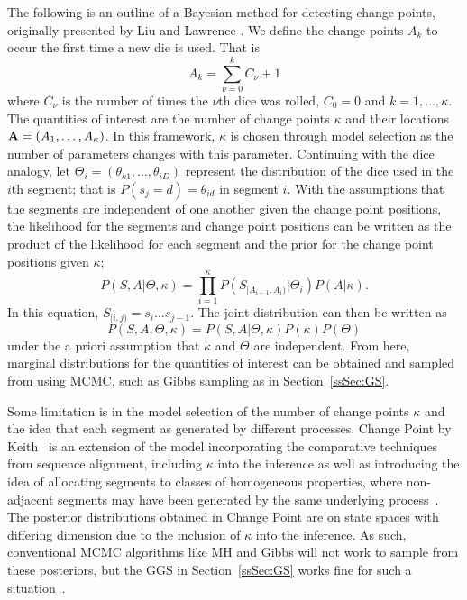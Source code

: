 The following is an outline of a Bayesian method for detecting change points, originally presented by Liu and Lawrence \cite{liu1999bayesian}. We define the change points $A_k$ to occur the first time a new die is used. That is
    \begin{equation}
        A_k = \sum_{\nu=0}^{k}C_\nu + 1
    \end{equation}
where $C_\nu$ is the number of times the $\nu$th dice was rolled, $C_0 = 0$ and $k = 1,\ldots,\kappa$. The quantities of interest are the number of change points $\kappa$ and their locations $\mathbf{A} = (A_1,\ldots,A_\kappa)$. In this framework, $\kappa$ is chosen through model selection as the number of parameters changes with this parameter. Continuing with the dice analogy, let $\Theta_i = (\theta_{k1},\ldots,\theta_{iD})$ represent the distribution of the dice used in the $i$th segment; that is $P(s_j = d) = \theta_{id}$ in segment $i$. With the assumptions that the segments are independent of one another given the change point positions, the likelihood for the segments and change point positions can be written as the product of the likelihood for each segment and the prior for the change point positions given $\kappa$;
    \begin{equation}
        P(S,A|\Theta, \kappa) = \prod_{i=1}^{\kappa} P(S_{[A_{i-1},A_{i})}|\Theta_i)P(A|\kappa).
    \end{equation}
In this equation, $S_{[i,j)} = s_i\ldots s_{j-1}$. The joint distribution can then be written as
    \begin{equation}
        P(S,A,\Theta,\kappa) =  P(S,A|\Theta, \kappa)P(\kappa)P(\Theta)
    \end{equation}
under the a priori assumption that $\kappa$ and $\Theta$ are independent. From here, marginal distributions for the quantities of interest can be obtained and sampled from using MCMC, such as Gibbs sampling as in Section~\ref{ssSec:GS}. 

Some limitation is in the model selection of the number of change points $\kappa$ and the idea that each segment as generated by different processes. 
Change Point by Keith~\cite{keith2006segmenting} is an extension of the model incorporating the comparative techniques from sequence alignment, including $\kappa$ into the inference as well as introducing the idea of allocating segments to classes of homogeneous properties, where non-adjacent segments may have been generated by the same underlying process~\cite{oldmeadow2009multiple}. The posterior distributions obtained in Change Point are on state spaces with differing dimension due to the inclusion of $\kappa$ into the inference. As such, conventional MCMC algorithms like MH and Gibbs will not work to sample from these posteriors, but the GGS in Section~\ref{ssSec:GS} works fine for such a situation~\cite{keith2004generalized}.


